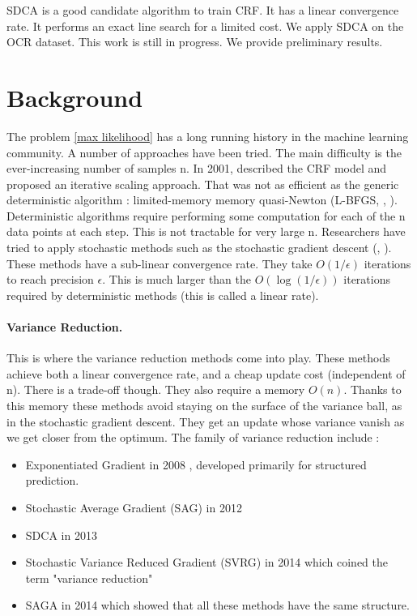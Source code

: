 \documentclass{article}
\DeclareMathOperator{\1}{\mathbb{1}}
\begin{document}
SDCA is a good candidate algorithm to train CRF.
It has a linear convergence rate.
It performs an exact line search for a limited cost.
We apply SDCA on the OCR dataset.
This work is still in progress.
We provide preliminary results.

\clearpage
\tableofcontents

\section{Background}
The problem \ref{max likelihood} has a long running history in the machine learning community.
A number of approaches have been tried.
The main difficulty is the ever-increasing number of samples n.
In 2001, \cite{lafferty_conditional_2001} described the CRF model and proposed an iterative scaling approach.
That was not as efficient as the generic deterministic algorithm : limited-memory memory quasi-Newton (L-BFGS, \cite{wallach_efficient_2002}, \cite{sha_shallow_2003}).
Deterministic algorithms require performing some computation for each of the n data points at each step.
This is not tractable for very large n.
Researchers have tried to apply stochastic methods such as the stochastic gradient descent (\cite{vishwanathan_accelerated_2006}, \cite{finkel_efficient_2008}).
These methods have a sub-linear convergence rate.
They take $O(1/\epsilon)$ iterations to reach precision $\epsilon$.
This is much larger than the $O(\log(1/\epsilon))$ iterations required by deterministic methods (this is called a linear rate).

\paragraph{Variance Reduction.}
This is where the variance reduction methods come into play.
These methods achieve both a linear convergence rate, and a cheap update cost (independent of n).
There is a trade-off though.
They also require a memory  $O(n)$.
Thanks to this memory these methods avoid staying on the surface of the variance ball, as in the stochastic gradient descent.
They get an update whose variance vanish as we get closer from the optimum.
The family of variance reduction  include : 
\begin{itemize}
	\item	 Exponentiated Gradient in 2008 \cite{collins_exponentiated_2008}, developed primarily for structured prediction.
	\item Stochastic Average Gradient (SAG) in 2012 \cite{roux_stochastic_2012}
	\item SDCA in 2013
	\item Stochastic Variance Reduced Gradient (SVRG) in 2014 \cite{johnson_accelerating_2013} which coined the term "variance reduction"
	\item SAGA in 2014 \cite{defazio_saga:_2014} which showed that all these methods have the same structure.  
\end{itemize}
\end{document}
